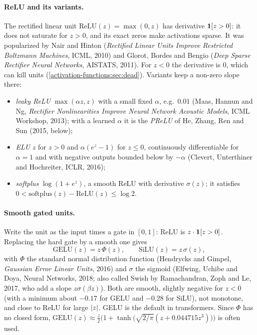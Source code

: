 \begin{notechapter}
\paragraph{ReLU and its variants.} The rectified linear unit $\mathrm{ReLU}(z) = \max(0, z)$ has derivative
$\mathbf{1}[z>0]$: it does not saturate for $z>0$, and its exact zeros make activations sparse. It was
popularized by Nair and Hinton (\emph{Rectified Linear Units Improve Restricted Boltzmann
Machines}, ICML, 2010) and Glorot, Bordes and Bengio (\emph{Deep Sparse Rectifier Neural
Networks}, AISTATS, 2011). For $z<0$ the derivative is $0$, which can kill units
(\cref{activation-functions:sec:dead}). Variants keep a non-zero slope there:
\begin{itemize}[nosep]
  \item \emph{leaky ReLU} $\max(\alpha z, z)$ with a small fixed $\alpha$, e.g.\ $0.01$ (Maas, Hannun and Ng,
        \emph{Rectifier Nonlinearities Improve Neural Network Acoustic Models}, ICML Workshop, 2013);
        with a learned $\alpha$ it is the \emph{PReLU} of He, Zhang, Ren and Sun (2015, below);
  \item \emph{ELU} $z$ for $z>0$ and $\alpha(e^z - 1)$ for $z\leq0$, continuously differentiable for $\alpha = 1$ and with negative outputs
        bounded below by $-\alpha$ (Clevert, Unterthiner and Hochreiter, ICLR, 2016);
  \item \emph{softplus} $\log(1 + e^z)$, a smooth ReLU with derivative $\sigma(z)$; it satisfies
        $0<\mathrm{softplus}(z) - \mathrm{ReLU}(z)\leq\log2$.
\end{itemize}

\paragraph{Smooth gated units.} Write the unit as the input times a gate in $[0,1]$:
ReLU is $z\cdot\mathbf{1}[z>0]$. Replacing the hard gate by a smooth one gives
\[
  \mathrm{GELU}(z) = z\,\Phi(z),\qquad\mathrm{SiLU}(z) = z\,\sigma(z),
\]
with $\Phi$ the standard normal distribution function (Hendrycks and Gimpel, \emph{Gaussian
Error Linear Units}, 2016) and $\sigma$ the sigmoid (Elfwing, Uchibe and Doya, Neural Networks,
2018; also called Swish by Ramachandran, Zoph and Le, 2017, who add a slope $z\sigma(\beta z)$). Both
are smooth, slightly negative for $z<0$ (with a minimum about $-0.17$ for GELU and $-0.28$ for
SiLU), not monotone, and close to ReLU for large $\left|z\right|$. GELU is the default in transformers.
Since $\Phi$ has no closed form, $\mathrm{GELU}(z)\approx\frac z2\bigl(1 + \tanh\bigl(\sqrt{2/\pi}(z + 0.044715z^3)\bigr)\bigr)$ is
often used.


\end{notechapter}

